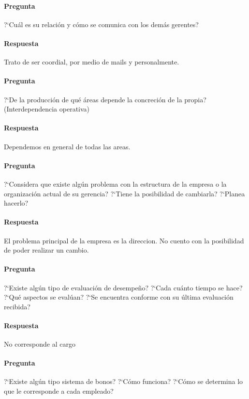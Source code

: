 \documentclass[12pt,a4paper,spanish]{article}
\begin{document}
	\paragraph{Pregunta}
	 ?`Cu\'al es su relaci\'on y c\'omo se comunica con los dem\'as gerentes?
	\paragraph{Respuesta}
Trato de ser coordial, por medio de mails y personalmente.

	\paragraph{Pregunta}
	 ?`De la producci\'on de qu\'e \'areas depende la concreci\'on de la propia? (Interdependencia operativa)
	\paragraph{Respuesta}
Dependemos en general de todas las areas.

	\paragraph{Pregunta}
	 ?`Considera que existe alg\'un problema con la estructura de la empresa o la organizaci\'on actual de su gerencia?  ?`Tiene la posibilidad de cambiarla?  ?`Planea hacerlo?
	\paragraph{Respuesta}
El problema principal de la empresa es la direccion. No cuento con la posibilidad de poder realizar un cambio.

	\paragraph{Pregunta}
	 ?`Existe alg\'un tipo de evaluaci\'on de desempe\~{n}o?  ?`Cada cu\'anto tiempo se hace?  ?`Qu\'e aspectos se eval\'uan?  ?`Se encuentra conforme con su \'ultima evaluaci\'on recibida?
	\paragraph{Respuesta}
No corresponde al cargo

	\paragraph{Pregunta}
	 ?`Existe alg\'un tipo sistema de bonos?  ?`C\'omo funciona?  ?`C\'omo se determina lo que le corresponde a cada empleado?
\end{document}
